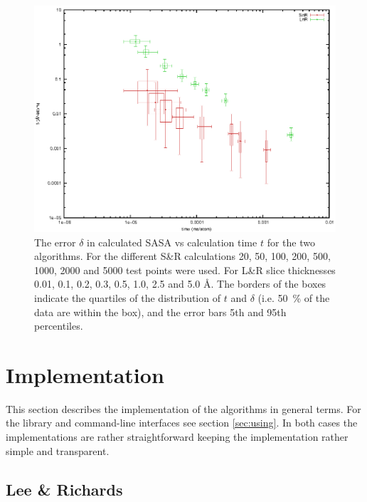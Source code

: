\documentclass[a4paper,11pt]{article}
\begin{document}
\begin{figure}
  \begin{center}
  \includegraphics{../analysis/plots/precision}
  \caption{The error $\delta$ in calculated SASA vs calculation time
    $t$ for the two algorithms. For the different S\&R calculations
    20, 50, 100, 200, 500, 1000, 2000 and 5000 test points were
    used. For L\&R slice thicknesses 0.01, 0.1, 0.2, 0.3, 0.5, 1.0,
    2.5 and 5.0 Å. The borders of the boxes indicate the quartiles of
    the distribution of $t$ and $\delta$ (i.e. 50~\% of the data are
    within the box), and the error bars 5th and 95th percentiles.
    \label{fig:precision}}
  \end{center}
\end{figure}


\section{Implementation}

This section describes the implementation of the algorithms in general
terms. For the library and command-line interfaces see section
\ref{sec:using}. In both cases the implementations are rather
straightforward keeping the implementation rather simple and
transparent.

\subsection{Lee \& Richards}
\end{document}
